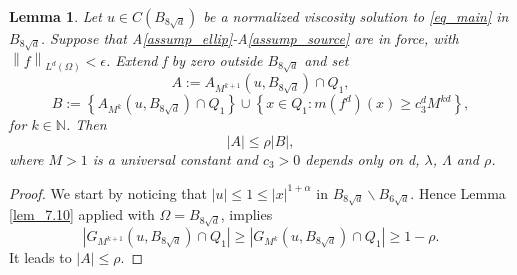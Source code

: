 \documentclass[10pt]{article} %
\newtheorem{Lemma}{Lemma}
\begin{document}
\begin{Lemma}\label{lem_7.12}
Let $u \in   C (B_{8\sqrt{d}})$ be a normalized viscosity solution to \eqref{eq_main} in $B_{8\sqrt{d}}$. Suppose that A\ref{assump_ellip}-A\ref{assump_source} are in force, { {with $\left\|f\right\|_{L^d(\Omega)}<\epsilon$.}} Extend f by zero outside $B_{8\sqrt{d}}$ and set
\[
A:=A_{M^{k+1}}(u, B_{8\sqrt{d}})\cap Q_1,
\]
\[
B:=\left\lbrace A_{M^{k}}(u, B_{8\sqrt{d}})\cap Q_1\right\rbrace\cup \left\lbrace x\in Q_1:m(f^d)(x) \geq c_3^dM^{kd}\right\rbrace,
\]
for $k\in\mathbb{N}$. Then
\[
|A| \leq \rho|B|,
\]
where $M>1$ is a universal constant and $c_3>0$ depends only on d, $\lambda$, $\Lambda$ and $\rho$.
\end{Lemma}
\begin{proof}
We start by noticing that $|u|\leq 1 \leq |x|^{1 + \alpha}$ in $B_{8\sqrt{d}}\backslash B_{6\sqrt{d}}$. Hence  Lemma \ref{lem_7.10} applied with $\Omega = B_{8\sqrt{d}}$, implies 
\[
|G_{M^{k+1}}(u,B_{8\sqrt{d}})\cap Q_1| \geq |G_{M^{k}}(u,B_{8\sqrt{d}})\cap Q_1| \geq 1-\rho.
\] 
It leads to $|A| \leq \rho$.


\end{proof}
\end{document}

